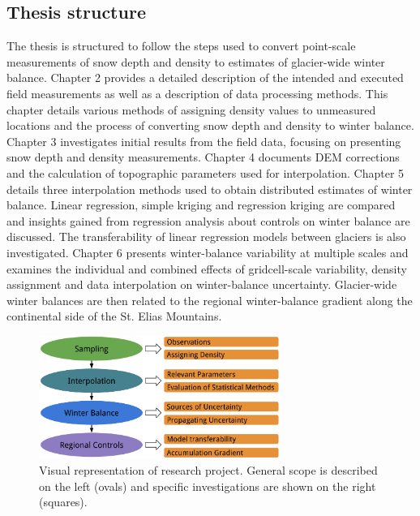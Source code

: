 \documentclass{sfuthesis}
\begin{document}
\subsection{Thesis structure}
The thesis is structured to follow the steps used to convert point-scale measurements of snow depth and density to estimates of glacier-wide winter balance. Chapter 2 provides a detailed description of the intended and executed field measurements as well as a description of data processing methods. This chapter details various methods of assigning density values to unmeasured locations and the process of converting snow depth and density to winter balance. Chapter 3 investigates initial results from the field data, focusing on presenting snow depth and density measurements. Chapter 4 documents DEM corrections and the calculation of topographic parameters used for interpolation. Chapter 5 details three interpolation methods used to obtain distributed estimates of winter balance. Linear regression, simple kriging and regression kriging are compared and insights gained from regression analysis about controls on winter balance are discussed. The transferability of linear regression models between glaciers is also investigated. Chapter 6 presents winter-balance variability at multiple scales and examines the individual and combined effects of gridcell-scale variability, density assignment and data interpolation on winter-balance uncertainty. Glacier-wide winter balances are then related to the regional winter-balance gradient along the continental side of the St. Elias Mountains. 

 \begin{figure}[H]
 \centering
           \includegraphics[width =0.7\textwidth]{MastersFlow.png}
       \caption[Visual representation of research project]{Visual representation of research project. General scope is described on the left (ovals) and specific investigations are shown on the right (squares).}
       \label{fig:flowchart_project}
\end{figure}
\end{document}
